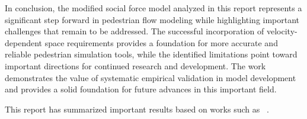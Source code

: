 \documentclass[12pt,a4paper]{article}
\begin{document}
In conclusion, the modified social force model analyzed in this report represents a significant step forward in pedestrian flow modeling while highlighting important challenges that remain to be addressed. The successful incorporation of velocity-dependent space requirements provides a foundation for more accurate and reliable pedestrian simulation tools, while the identified limitations point toward important directions for continued research and development. The work demonstrates the value of systematic empirical validation in model development and provides a solid foundation for future advances in this important field.

This report has summarized important results based on works such as ~\cite{Seyfried2006}.










\end{document}
